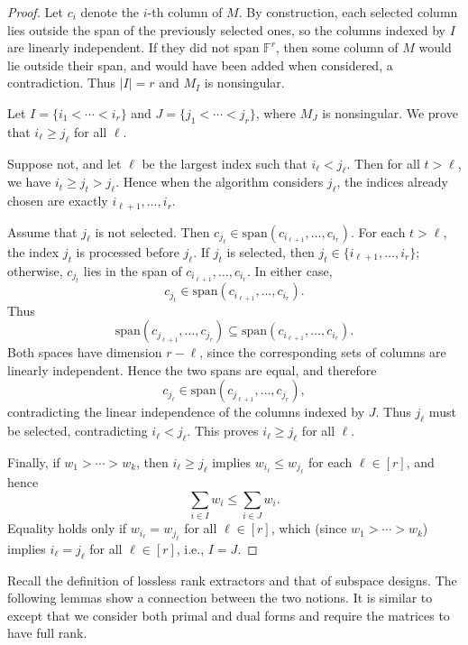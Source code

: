 \documentclass[11pt]{article}
\newcommand{\F}{\mathbb{F}}
\newcommand{\Span}{\mathrm{span}}
\begin{document}
\begin{proof}
Let $c_i$ denote the $i$-th column of $M$. By construction, each selected column lies outside the span of the previously selected ones, so the columns indexed by $I$ are linearly independent. If they did not span $\F^r$, then some column of $M$ would lie outside their span, and would have been added when considered, a contradiction. Thus $|I|=r$ and $M_I$ is nonsingular.

Let $I=\{i_1<\cdots<i_r\}$ and $J=\{j_1<\cdots<j_r\}$, where $M_J$ is nonsingular. We prove that $i_\ell \ge j_\ell$ for all $\ell$.

Suppose not, and let $\ell$ be the largest index such that $i_\ell < j_\ell$. Then for all $t > \ell$, we have $i_t \ge j_t > j_\ell$. Hence when the algorithm considers $j_\ell$, the indices already chosen are exactly $i_{\ell+1},\dots,i_r$.

Assume that $j_\ell$ is not selected. Then $c_{j_\ell} \in \Span(c_{i_{\ell+1}},\dots,c_{i_r})$. For each $t > \ell$, the index $j_t$ is processed before $j_\ell$. If $j_t$ is selected, then $j_t \in \{i_{\ell+1},\dots,i_r\}$; otherwise, $c_{j_t}$ lies in the span of $c_{i_{\ell+1}},\dots,c_{i_r}$. In either case,
\[
c_{j_t} \in \Span(c_{i_{\ell+1}},\dots,c_{i_r}).
\]
Thus
\[
\Span(c_{j_{\ell+1}},\dots,c_{j_r})
\subseteq
\Span(c_{i_{\ell+1}},\dots,c_{i_r}).
\]
Both spaces have dimension $r-\ell$, since the corresponding sets of columns are linearly independent. Hence the two spans are equal, and therefore
\[
c_{j_\ell} \in \Span(c_{j_{\ell+1}},\dots,c_{j_r}),
\]
contradicting the linear independence of the columns indexed by $J$. Thus $j_\ell$ must be selected, contradicting $i_\ell < j_\ell$. This proves $i_\ell \ge j_\ell$ for all $\ell$.

Finally, if $w_1 > \cdots > w_k$, then $i_\ell \ge j_\ell$ implies $w_{i_\ell} \le w_{j_\ell}$ for each $\ell\in [r]$, and hence
\[
\sum_{i\in I} w_i \le \sum_{i\in J} w_i.
\]
Equality holds only if $w_{i_\ell} = w_{j_\ell}$ for all $\ell\in [r]$, which (since $w_1 > \cdots > w_k$) implies $i_\ell = j_\ell$ for all $\ell\in [r]$, i.e., $I = J$.
\end{proof}

Recall the definition of lossless rank extractors and that of subspace designs. The following lemmas show a connection between the two notions. 
It is similar to \cite[Proposition~6.1]{FG15} except that we consider both primal and dual forms and require the matrices to have full rank.
\end{document}

